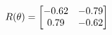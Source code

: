 \documentclass[preview]{standalone}
\begin{document}
\begin{align*}
\special{dvisvgm:raw <g id='unique000'>}R(\theta) = \begin{bmatrix}-0.62 & -0.79\\0.79 & -0.62\end{bmatrix}\special{dvisvgm:raw </g>}
\end{align*}
\end{document}
